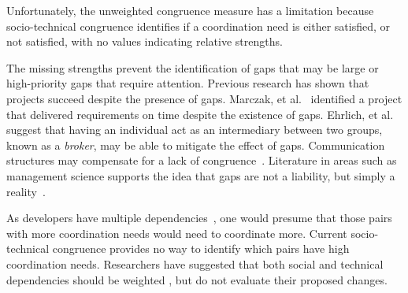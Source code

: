 \documentclass[12pt,oneside]{book}
\begin{document}
Unfortunately, the unweighted congruence measure has a limitation because socio-technical congruence identifies if a coordination need is either satisfied, or not satisfied, with no values indicating relative strengths.

The missing strengths prevent the identification of gaps that may be large or high-priority gaps that require attention.  Previous research has shown that projects succeed despite the presence of gaps. Marczak, et al.~\cite{marczak:re:2008} identified a project that delivered requirements on time despite the existence of gaps. 
Ehrlich, et al.~\cite{ehrlich2008:gaps} suggest that having an individual act as an intermediary between two groups, known as a \emph{broker}, may be able to mitigate the effect of gaps.
Communication structures may compensate for a lack of congruence~\cite{hinds:cscw:2006}. Literature in areas such as management science supports the idea that gaps are not a liability, but simply a reality~\cite{deSouza2004:thwarts_collaboration,hossain:cscw:2006}.

As developers have multiple dependencies~\cite{desouza2007:awarenessnetwork,mockus2002:opensource}, one would presume that those pairs with more coordination needs would need to coordinate more. Current socio-technical congruence provides no way to identify which pairs have high coordination needs. Researchers have suggested that both social and technical dependencies should be weighted \cite{valetto:msr:2007,kwan2009:weighted}, 
but do not evaluate their proposed changes.






\end{document}
